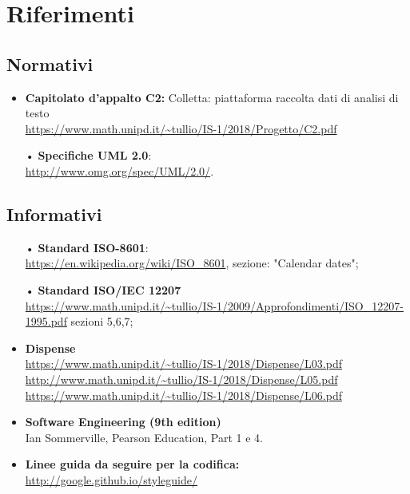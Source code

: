 \section{Riferimenti}

\subsection{Normativi}
\begin{itemize}

\item \textbf{Capitolato d’appalto C2:} Colletta: piattaforma raccolta dati di analisi di testo\\
\url{https://www.math.unipd.it/~tullio/IS-1/2018/Progetto/C2.pdf}

\item[•]\textbf{Specifiche {UML} 2.0}:\\
\url{http://www.omg.org/spec/UML/2.0/}.

\end{itemize} 
\subsection{Informativi}
\begin{itemize}
\item[•]\textbf{Standard {ISO}-8601}:\\
\url{https://en.wikipedia.org/wiki/ISO_8601}, sezione: "Calendar dates";
\item[•]\textbf{Standard ISO/{IEC} 12207}\\
\url{https://www.math.unipd.it/~tullio/IS-1/2009/Approfondimenti/ISO_12207-1995.pdf} sezioni 5,6,7;
\item \textbf{Dispense} \\
\url{https://www.math.unipd.it/~tullio/IS-1/2018/Dispense/L03.pdf}\\
\url{http://www.math.unipd.it/~tullio/IS-1/2018/Dispense/L05.pdf}\\
\url{https://www.math.unipd.it/~tullio/IS-1/2018/Dispense/L06.pdf}\\
\item \textbf{Software Engineering (9th edition)}\\ Ian Sommerville, Pearson Education, Part 1 e 4.
\item \textbf{Linee guida da seguire per la codifica:} \\
\url{http://google.github.io/styleguide/}

\end{itemize}
